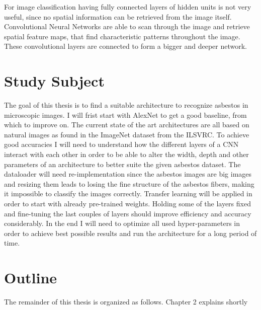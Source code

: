 For image classification having fully connected layers of hidden units is not very useful, since no spatial information can be retrieved from the image itself. Convolutional Neural Networks are able to scan through the image and retrieve spatial feature maps, that find characteristic patterns throughout the image. These convolutional layers are connected to form a bigger and deeper network.  \\

\section{Study Subject}

The goal of this thesis is to find a suitable architecture to recognize asbestos in microscopic images. I will frist start with AlexNet to get a good baseline, from which to improve on. The current state of the art architectures are all based on natural images as found in the ImageNet dataset from the ILSVRC. To achieve good accuracies I will need to understand how the different layers of a CNN interact with each other in order to be able to alter the width, depth and other parameters of an architecture to better suite the given asbestos dataset. The dataloader will need re-implementation since the asbestos images are big images and resizing them leads to losing the fine structure of the asbestos fibers, making it impossible to classify the images correctly. Transfer learning will be applied in order to start with already pre-trained weights. Holding some of the layers fixed and fine-tuning the last couples of layers should improve efficiency and accuracy considerably. In the end I will need to optimize all used hyper-parameters in order to achieve best possible results and run the architecture for a long period of time.

\section{Outline}

The remainder of this thesis is organized as follows. Chapter 2 explains shortly 
